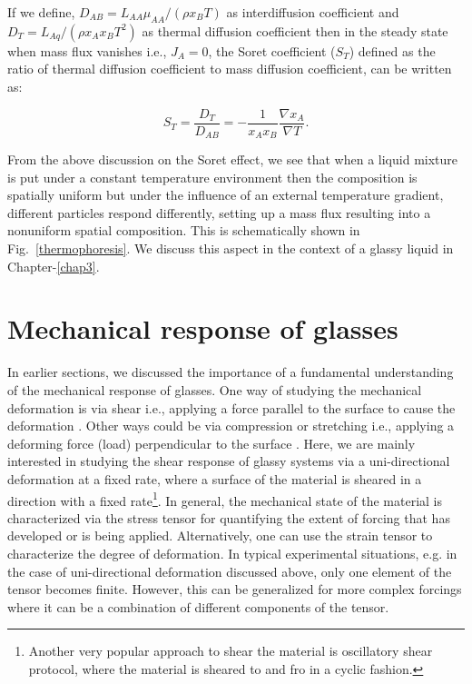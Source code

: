     If we define, $D_{AB} = L_{AA}\mu_{AA}/(\rho x_BT)$ as interdiffusion coefficient and $D_T = L_{Aq}/(\rho x_Ax_BT^2)$ as thermal diffusion coefficient then in the steady state when mass flux vanishes i.e., $J_A = 0$, the Soret coefficient ($S_T$) defined as the ratio of thermal diffusion coefficient to mass diffusion coefficient, can be written as:
    
    \begin{equation}
        S_T = \frac{D_T}{D_{AB}} = -\frac{1}{x_Ax_B} \frac{\nabla x_A}{\nabla T}.
    \end{equation}
    
    From the above discussion on the Soret effect, we see that when a liquid mixture is put under a constant temperature environment then the composition is spatially uniform but under the influence of an external temperature gradient, different particles respond differently, setting up a mass flux resulting into a nonuniform spatial composition. This is schematically shown in Fig.~\ref{thermophoresis}. We discuss this aspect in the context of a glassy liquid in Chapter-\ref{chap3}.
    
   

\section{Mechanical response of glasses}
In earlier sections, we discussed the importance of a fundamental understanding of the mechanical response of glasses. One way of studying the mechanical deformation is via shear i.e., applying a force parallel to the surface to cause the deformation \cite{chhabra2011non,larson}. Other ways could be via compression or stretching i.e., applying a deforming force (load) perpendicular to the surface \cite{chaudhuri2016structural}. Here, we are mainly interested in studying the shear response of glassy systems via a uni-directional deformation at a fixed rate, where a surface of the material is sheared in a direction with a fixed rate\footnote{Another very popular approach to shear the material is oscillatory shear protocol, where the material is sheared to and fro in a cyclic fashion.}. In general, the mechanical state of the material is characterized via the stress tensor for quantifying the extent of forcing that has developed or is being applied. Alternatively, one can use the strain tensor to characterize the degree of deformation. In typical experimental situations, e.g. in the case of uni-directional deformation discussed above, only one element of the tensor becomes finite. However, this can be generalized for more complex forcings where it can be a combination of different components of the tensor. 

